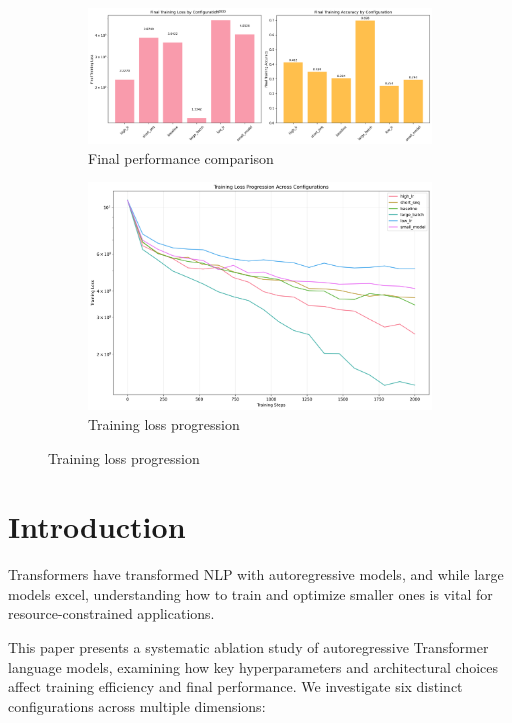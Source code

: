 \documentclass[11pt,a4paper]{article}
\begin{document}
\begin{figure}[H]
    \centering
    \begin{subfigure}{0.48\textwidth}
        \centering
        \includegraphics[width=\linewidth]{research/final_performance_comparison.png}
        \caption{Final performance comparison}
    \end{subfigure}
    \hfill
    \begin{subfigure}{0.48\textwidth}
        \centering
        \includegraphics[width=\linewidth]{research/training_loss_comparison.png}
        \caption{Training loss progression}
    \end{subfigure}
\end{figure}

\section{Introduction}
Transformers have transformed NLP with autoregressive models, and while large models excel, understanding how to train and optimize smaller ones is vital for resource-constrained applications.

This paper presents a systematic ablation study of autoregressive Transformer language models, examining how key hyperparameters and architectural choices affect training efficiency and final performance. We investigate six distinct configurations across multiple dimensions:
\end{document}
